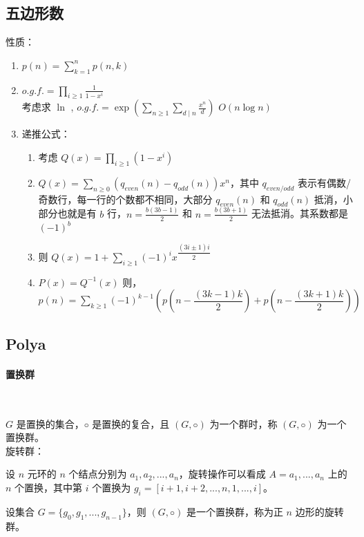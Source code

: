 \subsection{五边形数}

性质：
\begin{enumerate}
    \item $p(n)=\sum\limits_{k=1}^{n}p(n,k)$
    \item $o.g.f.=\prod\limits_{i\ge1}{\frac{1}{1-x^i}}$\\
    考虑求 $\ln$ , $o.g.f.=\exp(\sum_{n\ge1}{\sum_{d\mid n} {\frac{x^n}{d}}})$ $O(n\log{n})$
    \item 递推公式：
        \begin{enumerate}
            \item 考虑 $Q(x)=\prod_{i\ge1}(1-x^i)$
            \item $Q(x)=\sum_{n\ge0}(q_{even}(n)-q_{odd}(n))x^n，其中 $ $q_{even/odd}$ 表示有偶数/奇数行，每一行的个数都不相同，大部分 $q_{even}(n)$ 和 $q_{odd}(n)$ 抵消，小部分也就是有 $b$ 行，$n=\frac{b(3b-1)}{2}$ 和 $n=\frac{b(3b+1)}{2}$ 无法抵消。其系数都是 $(-1)^b$
            \item 则 $Q(x)=1+\sum_{i\ge1}(-1)^ix^{\dfrac{(3i\pm1)i}{2}}$
            \item $P(x)=Q^{-1}(x)$ 则，$p(n)=\sum_{k\ge1}(-1)^{k-1}\left(p\left(n-\dfrac{(3k-1)k}{2}\right)+p\left(n-\dfrac{(3k+1)k}{2}\right)\right)$
        \end{enumerate}
\end{enumerate}

\subsection{Polya}

\paragraph{置换群}\

$G$ 是置换的集合，$◦$ 是置换的复合，且 $(G, ◦)$ 为一个群时，称 $(G, ◦)$ 为一个置换群。 \\


\noindent 旋转群：

设 $n$ 元环的 $n$ 个结点分别为 $a_1,a_2, ...,a_n$，旋转操作可以看成 $A = {a_1, ..., a_n}$ 上的 $n$ 个置换，其中第 $i$ 个置换为 $g_i = [i + 1,i + 2, ...,n,1, ...,i]$。 

设集合 $G= \{g_0,g_1, ...,g_{n−1}\}$，则 $(G,◦)$ 是一个置换群，称为正 $n$ 边形的旋转群。\\

